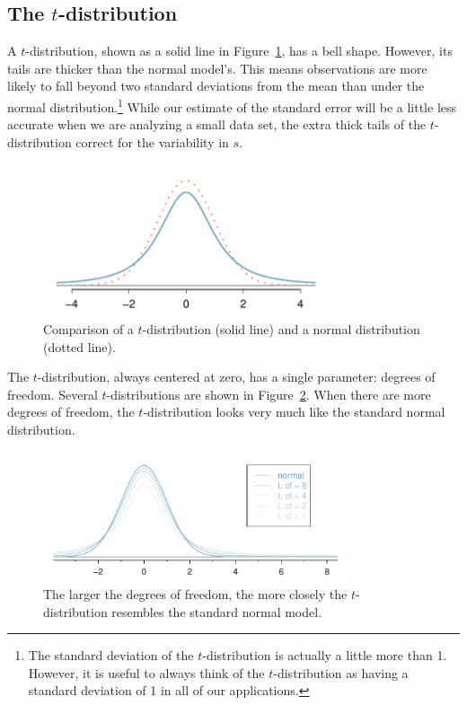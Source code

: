 \subsection{The $t$-distribution}
\label{introducingTheTDistribution}


A $t$-distribution, shown as a solid line in Figure~\ref{tDistCompareToNormalDist}, has a bell shape. However, its tails are thicker than the normal model's. This means observations are more likely to fall beyond two standard deviations from the mean than under the normal distribution.\footnote{The standard deviation of the $t$-distribution is actually a little more than 1. However, it is useful to always think of the $t$-distribution as having a standard deviation of 1 in all of our applications.} While our estimate of the standard error will be a little less accurate when we are analyzing a small data set, the extra thick tails of the $t$-distribution correct for the variability in $s$. 

\begin{figure}
\centering
\includegraphics[height=45mm]{ch_inference_for_means_oi_biostat/figures/tDistCompareToNormalDist/tDistCompareToNormalDist}
\caption{Comparison of a $t$-distribution (solid line) and a normal distribution (dotted line).}
\label{tDistCompareToNormalDist}
\end{figure}

The $t$-distribution, always centered at zero, has a single parameter: degrees of freedom.  Several $t$-distributions are shown in Figure~\ref{tDistConvergeToNormalDist}. When there are more degrees of freedom, the $t$-distribution looks very much like the standard normal distribution.

\begin{figure}
\centering
\includegraphics[width=0.8\textwidth]{ch_inference_for_means_oi_biostat/figures/tDistConvergeToNormalDist/tDistConvergeToNormalDist}
\caption{The larger the degrees of freedom, the more closely the $t$-distribution resembles the standard normal model.}
\label{tDistConvergeToNormalDist}
\end{figure}

